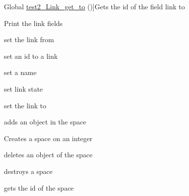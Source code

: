 \begin{DoxyRefList}
Global \hyperlink{link__tb_8c_a608afd45fbc7e7e40f0c20e387059738}{test2\+\_\+\+Link\+\_\+get\+\_\+to} ()]Gets the id of the field link to  
\item[\label{test__test000030}%
\Hypertarget{test__test000030}%
Global \hyperlink{link__tb_8c_a3852e51267b20f4d7650c9ddc0fd4025}{test2\+\_\+\+Link\+\_\+print} ()]Print the link fields  
\item[\label{test__test000026}%
\Hypertarget{test__test000026}%
Global \hyperlink{link__tb_8c_af6d79d724af1e62281d0bf3a3abb709d}{test2\+\_\+\+Link\+\_\+set\+\_\+from} ()]set the link from  
\item[\label{test__test000020}%
\Hypertarget{test__test000020}%
Global \hyperlink{link__tb_8c_a1b2d6e91e825144f230e81eff9a6f662}{test2\+\_\+\+Link\+\_\+set\+\_\+id} ()]set an id to a link  
\item[\label{test__test000022}%
\Hypertarget{test__test000022}%
Global \hyperlink{link__tb_8c_af7f9cda1060622ad823e91458ed766cb}{test2\+\_\+\+Link\+\_\+set\+\_\+name} ()]set a name  
\item[\label{test__test000028}%
\Hypertarget{test__test000028}%
Global \hyperlink{link__tb_8c_a243f5384fc1bb4a71c41fb80e5437e62}{test2\+\_\+\+Link\+\_\+set\+\_\+state} ()]set link state  
\item[\label{test__test000024}%
\Hypertarget{test__test000024}%
Global \hyperlink{link__tb_8c_a76f0837f797222f8dcb67da889f1e05c}{test2\+\_\+\+Link\+\_\+set\+\_\+to} ()]set the link to  
\item[\label{test__test000066}%
\Hypertarget{test__test000066}%
Global \hyperlink{space__tb_8c_af5de291847d272d79a524c30b96f6f0c}{test2\+\_\+space\+\_\+add\+\_\+object} ()]adds an object in the space  
\item[\label{test__test000040}%
\Hypertarget{test__test000040}%
Global \hyperlink{space__tb_8c_a012cd3cf37a8d91e2d7098a264c29d65}{test2\+\_\+space\+\_\+create} ()]Creates a space on an integer  
\item[\label{test__test000064}%
\Hypertarget{test__test000064}%
Global \hyperlink{space__tb_8c_a5727fc65ee0f976061f63d2bfd7e95fe}{test2\+\_\+space\+\_\+del\+\_\+object} ()]deletes an object of the space  
\item[\label{test__test000042}%
\Hypertarget{test__test000042}%
Global \hyperlink{space__tb_8c_ad8a5df09bd9f731be1ce6048e92e58c4}{test2\+\_\+space\+\_\+destroy} ()]destroys a space  
\item[\label{test__test000044}%
\Hypertarget{test__test000044}%
Global \hyperlink{space__tb_8c_af9087176b0d3c41d83a17a4918b13e31}{test2\+\_\+space\+\_\+get\+\_\+id} ()]gets the id of the space  

\end{DoxyRefList}
